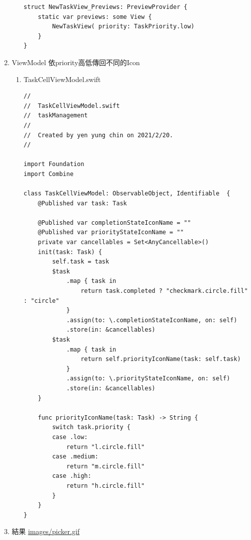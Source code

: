 \documentclass[a4paper,12pt]{article}
\begin{document}
\begin{enumerate}
\begin{enumerate}
\begin{lstlisting}
struct NewTaskView_Previews: PreviewProvider {
    static var previews: some View {
        NewTaskView( priority: TaskPriority.low)
    }
}

\end{lstlisting}
\end{enumerate}
\item ViewModel
\label{sec:orge41d342}
依priority高低傳回不同的Icon\\
\begin{enumerate}
\item TaskCellViewModel.swift
\label{sec:org6b0f4e9}
\lstset{breaklines=true,language=swift,label= ,caption= ,captionpos=b,firstnumber=1,numbers=left}
\begin{lstlisting}
//
//  TaskCellViewModel.swift
//  taskManagement
//
//  Created by yen yung chin on 2021/2/20.
//

import Foundation
import Combine

class TaskCellViewModel: ObservableObject, Identifiable  {
    @Published var task: Task

    @Published var completionStateIconName = ""
    @Published var priorityStateIconName = ""
    private var cancellables = Set<AnyCancellable>()
    init(task: Task) {
        self.task = task
        $task
            .map { task in
                return task.completed ? "checkmark.circle.fill" : "circle"
            }
            .assign(to: \.completionStateIconName, on: self)
            .store(in: &cancellables)
        $task
            .map { task in
                return self.priorityIconName(task: self.task)
            }
            .assign(to: \.priorityStateIconName, on: self)
            .store(in: &cancellables)
    }

    func priorityIconName(task: Task) -> String {
        switch task.priority {
        case .low:
            return "l.circle.fill"
        case .medium:
            return "m.circle.fill"
        case .high:
            return "h.circle.fill"
        }
    }
}

\end{lstlisting}
\end{enumerate}

\item 結果
\label{sec:org60f632b}
\url{images/picker.gif}\\
\end{enumerate}
\end{document}

